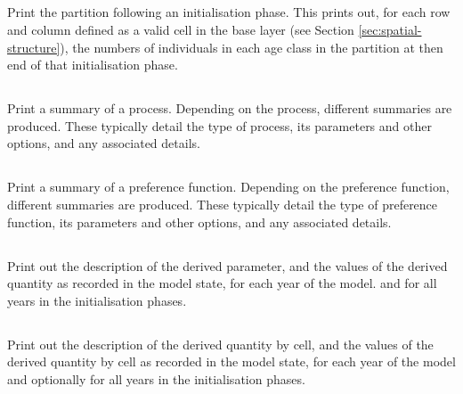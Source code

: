 \subsection{}

Print the partition following an initialisation phase. This prints out, for each row and column defined as a valid cell in the base layer (see Section \ref{sec:spatial-structure}), the numbers of individuals in each age class in the partition at then end of that initialisation phase.

\subsection{}

Print a summary of a process. Depending on the process, different summaries are produced. These typically detail the type of process, its parameters and other options, and any associated details.

\subsection{}

Print a summary of a preference function. Depending on the preference function, different summaries are produced. These typically detail the type of preference function, its parameters and other options, and any associated details.

\subsection{}

Print out the description of the derived parameter, and the values of the derived quantity as recorded in the model state, for each year of the model. and for all years in the  initialisation phases.

\subsection{}

Print out the description of the derived quantity by cell, and the values of the derived quantity by cell as recorded in the model state, for each year of the model and optionally for all years in the initialisation phases. 

